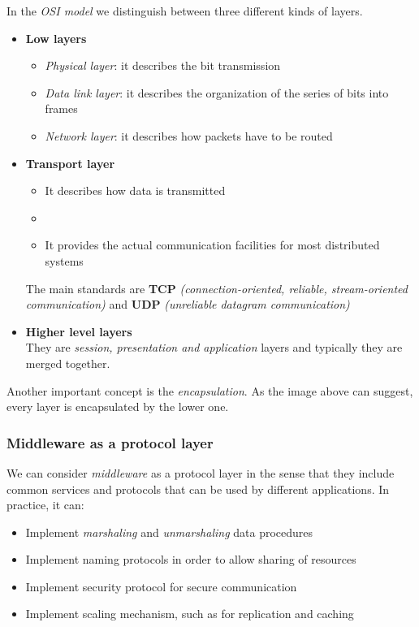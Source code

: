 In the \textit{OSI model} we distinguish between three different kinds of layers.
\begin{itemize}
    \item \textbf{Low layers}
        \begin{itemize}
            \item \textit{Physical layer}: it describes the bit transmission
            \item \textit{Data link layer}: it describes the organization of the series of bits into frames
            \item \textit{Network layer}: it describes how packets have to be routed
        \end{itemize}
    \item \textbf{Transport layer}
        \begin{itemize}
            \item It describes how data is transmitted
            \item {}
            \item It provides the actual communication facilities for most distributed systems
        \end{itemize}
        The main standards are \textbf{TCP} \textit{(connection-oriented, reliable, stream-oriented communication)} and \textbf{UDP} \textit{(unreliable datagram communication)}
    \item \textbf{Higher level layers}\\
        They are \textit{session, presentation and application} layers and typically they are merged together.
\end{itemize}
Another important concept is the \textit{encapsulation}. As the image above can suggest, every layer is encapsulated by the lower one.

\subsubsection{Middleware as a protocol layer}
We can consider \textit{middleware} as a protocol layer in the sense that they include common services and protocols that can be used by different applications. In practice, it can:
\begin{itemize}
    \item Implement \textit{marshaling} and \textit{unmarshaling} data procedures
    \item Implement naming protocols in order to allow sharing of resources
    \item Implement security protocol for secure communication
    \item Implement scaling mechanism, such as for replication and caching
\end{itemize}

